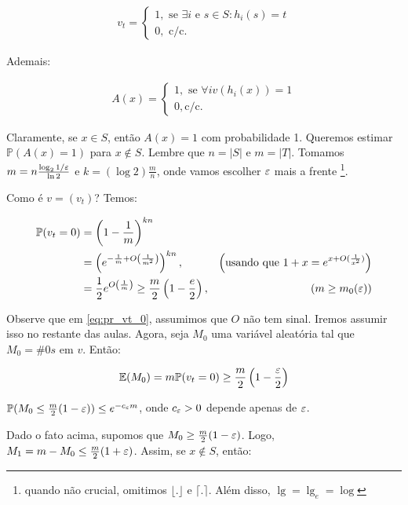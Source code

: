 \begin{align*}
  v_{t}=\begin{cases}
    1, \text{ se } \exists i \text{ e } s \in S : h_{i}(s)=t \\
    0, \text{ c/c. }
  \end{cases}
\end{align*}

Ademais:

\begin{align*}
  A(x)=\begin{cases}
    1, \text{ se } \forall i v(h_{i}(x))=1\\
    0, \text{c/c.}
  \end{cases}
\end{align*}

Claramente, se $x \in S$, então $A(x)=1$ com probabilidade 1. Queremos
estimar $\mathbb{P}(A(x)=1)$ para $x \notin S$. Lembre que $n=|S|$ e
$m=|T|$. Tomamos $m=n\frac{\lg_{2} 1/\eps}{\log 2}$ e $k=(\log 2)\frac{m}{n}$,
onde vamos escolher $\varepsilon$ mais a frente \footnote{quando não crucial,
omitimos $\lfloor . \rfloor$ e $\lceil . \rceil$. Além disso,
$\lg=\lg_{e}=\log$}.

Como é $v=(v_{t})$? Temos:

\begin{align}
\mathbb{P}(v_{t}=0) &= \left(1-\frac{1}{m}\right)^{kn}\\
                    &= \left(e^{-\frac{1}{m}+O\left(\frac{1}{m^2}\right)}\right)^{kn} \label{eq:pr_vt_0}, & \left(\text{usando que } 1+x=e^{x+O(\frac{1}{x^2})}\right) \\
                    &= \frac{1}{2}e^{O\left(\frac{1}{m}\right)} \geq \frac{m}{2}\left(1-\frac{e}{2}\right), & (m \geq m_{0}(\varepsilon))
\end{align}

Observe que em \eqref{eq:pr_vt_0}, assumimos que $O$ não tem
sinal. Iremos assumir isso no restante das aulas. Agora, seja $M_{0}$
uma variável aleatória tal que $M_{0}=\#0s$ em $v$. Então:

$$
\mathbb{E}(M_{0})=m\mathbb{P}(v_{t}=0) \geq \frac{m}{2}\left(1-\frac{\varepsilon}{2}\right)
$$

\begin{fato}
\label{fato:filtros_de_Bloom}
$\mathbb{P}(M_{0} \leq \frac{m}{2}(1-\varepsilon)) \leq e^{-c_{\varepsilon}m}$, onde $c_{\varepsilon} > 0$ depende apenas de $\varepsilon$.
\end{fato}

Dado o fato acima, supomos que $M_{0} \geq \frac{m}{2}(1-\varepsilon)$. Logo,
$M_{1}=m-M_{0} \leq \frac{m}{2}(1+\varepsilon)$. Assim, se $x \notin S$, então:

